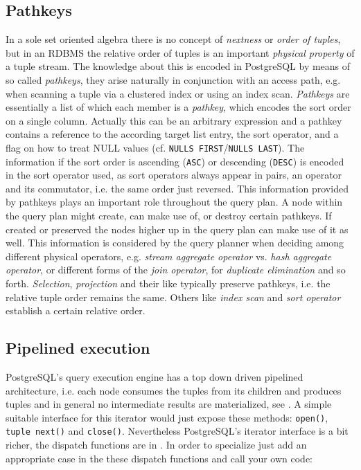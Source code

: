 \subsection{Pathkeys}
\label{sec:pathkeys}
In a sole set oriented algebra there is no concept of \emph{nextness}
or \emph{order of tuples}, but in an RDBMS the relative order of
tuples is an important \emph{physical property} of a tuple stream.
The knowledge about this is encoded in PostgreSQL by means of so
called \emph{pathkeys}, they arise naturally in conjunction with an
access path, e.g.  when scanning a tuple via a clustered index or
using an index scan.
\emph{Pathkeys} are essentially a list of which each member is a \emph{pathkey},
which encodes the sort order on a single column. Actually this can
be an arbitrary expression and a pathkey contains a reference to the
according target list entry, the sort operator, and a flag
on how to treat NULL values (cf. \texttt{NULLS FIRST}/\texttt{NULLS
LAST}). The information if the sort order is ascending (\texttt{ASC})
or descending (\texttt{DESC}) is encoded in the sort operator used, as
sort operators always appear in pairs, an operator and its commutator,
i.e. the same order just reversed.  This information provided by pathkeys plays an
important role throughout the query plan.  A node within the query plan
might create, can make use of, or destroy certain pathkeys.  If
created or preserved the nodes higher up in the query plan can make
use of it as well.  This information is considered by the query planner when
deciding among different physical operators, e.g. \emph{stream
aggregate operator} vs. \emph{hash aggregate operator}, or different
forms of the \emph{join operator}, for \emph{duplicate elimination}
and so forth. \emph{Selection}, \emph{projection} and their like
typically preserve pathkeys, i.e. the relative tuple order remains the
same. Others like \emph{index scan} and \emph{sort operator} establish
a certain relative order.


\subsection{Pipelined execution}
PostgreSQL's query execution engine has a top down driven pipelined
architecture, i.e. each node consumes the tuples from its children and
produces tuples and in general no intermediate results are
materialized, see .  A simple
suitable interface for this iterator would just expose these methods:
\texttt{open()}, \texttt{tuple next()} and \texttt{close()}.  Nevertheless
PostgreSQL's iterator interface is a bit richer, the dispatch functions
are in . In order to specialize
just add an appropriate case in the these dispatch functions and call
your own code:

